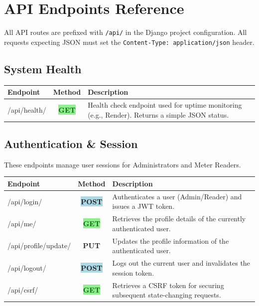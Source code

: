 \documentclass[12pt, a4paper]{report}
\newcommand{\httpget}{\colorbox{lightGreen}{\textcolor{darkGreen}{\textbf{\small GET}}}}
\newcommand{\httppost}{\colorbox{lightBlue}{\textcolor{deepBlue}{\textbf{\small POST}}}}
\newcommand{\httpput}{\colorbox{purple!10}{\textcolor{purple!70!black}{\textbf{\small PUT}}}}
\begin{document}
\chapter{API Endpoints Reference}

\begin{infobox}
All API routes are prefixed with \texttt{/api/} in the Django project configuration. All requests expecting JSON must set the \texttt{Content-Type: application/json} header.
\end{infobox}

\section{System Health}

\begin{table}[H]
\centering
\begin{tabularx}{\textwidth}{>{\ttfamily}l c X}
\toprule
\textbf{Endpoint} & \textbf{Method} & \textbf{Description} \\
\midrule
/api/health/ & \httpget & Health check endpoint used for uptime monitoring (e.g., Render). Returns a simple JSON status. \\
\bottomrule
\end{tabularx}
\end{table}

\section{Authentication \& Session}
These endpoints manage user sessions for Administrators and Meter Readers.

\begin{table}[H]
\centering
\begin{tabularx}{\textwidth}{>{\ttfamily}l c X}
\toprule
\textbf{Endpoint} & \textbf{Method} & \textbf{Description} \\
\midrule
/api/login/ & \httppost & Authenticates a user (Admin/Reader) and issues a JWT token. \\
/api/me/ & \httpget & Retrieves the profile details of the currently authenticated user. \\
/api/profile/update/ & \httpput & Updates the profile information of the authenticated user. \\
/api/logout/ & \httppost & Logs out the current user and invalidates the session token. \\
/api/csrf/ & \httpget & Retrieves a CSRF token for securing subsequent state-changing requests. \\
\bottomrule
\end{tabularx}
\end{table}
\end{document}
